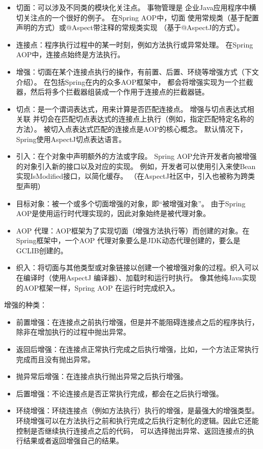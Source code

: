 \begin{itemize}
    \item 切面：可以涉及不同类的模块化关注点。 事物管理是
    企业Java应用程序中横切关注点的一个很好的例子。 在Spring AOP中，切面
    使用常规类（基于配置声明的方式）或@Aspect带注释的常规类实现
    （基于@AspectJ的方式）。
    \item 连接点：程序执行过程中的某一时刻，例如方法执行或异常处理。
     在Spring AOP中，连接点始终是方法执行。
    \item 增强：切面在某个连接点执行的操作，有前置、后置、环绕等增强方式（下文介绍）。
    在包括Spring在内的众多AOP框架中，
    都会将增强实现为一个拦截器，然后将多个拦截器组装成一个作用于连接点的拦截器链。
    \item 切点：是一个谓词表达式，用来计算是否匹配连接点。
    增强与切点表达式相关联
    并切会在匹配切点表达式的连接点上执行（例如，指定匹配特定名称的方法）。
    被切入点表达式匹配的连接点是AOP的核心概念。
    默认情况下，Spring使用AspectJ切点表达语言。
    \item 引入：在个对象中声明额外的方法或字段。
    Spring AOP允许开发者向被增强的对象引入新的接口以及对应的实现。
    例如，开发者可以使用引入来使Bean实现IsModified接口，以简化缓存。
    （在AspectJ社区中，引入也被称为跨类型声明）
    \item 目标对象：被一个或多个切面增强的对象，即“被增强对象”。
    由于Spring AOP是使用运行时代理实现的，因此对象始终是被代理对象。
    \item AOP 代理：AOP框架为了实现切面（增强方法执行等）而创建的对象。在Spring框架中，一个AOP 代理对象要么是JDK动态代理创建的，要么是GCLIB创建的。
    \item 织入：将切面与其他类型或对象链接以创建一个被增强对象的过程。织入可以在编译时（使用AspectJ 编译器）、加载时和运行时执行。
    像其他纯Java实现的AOP框架一样，Spring AOP 在运行时完成织入。
\end{itemize}

增强的种类：

\begin{itemize}
    \item 前置增强：在连接点之前执行增强，但是并不能阻碍连接点之后的程序执行，除非在增加执行的过程中抛出异常。
    \item 返回后增强：在连接点正常执行完成之后执行增强，比如，一个方法正常执行完成而且没有抛出异常。
    \item 抛异常后增强：在连接点执行抛出异常之后执行增强。
    \item 后置增强：不论连接点是否正常执行完成，都会在之后执行增强。
    \item 环绕增强：环绕连接点（例如方法执行）执行的增强，是最强大的增强类型。
    环绕增强可以在方法执行之前和执行完成之后执行定制化的逻辑。因此它还能控制是否继续执行连接点之后的代码，
    可以选择抛出异常、返回连接点的执行结果或者返回增强自己的结果。
\end{itemize}

